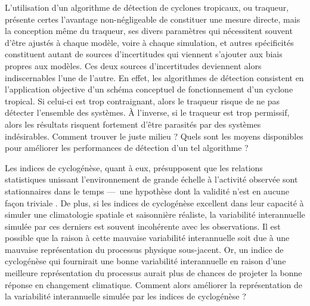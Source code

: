 \documentclass[../main.tex]{subfiles}
\begin{document}
L'utilisation d'un algorithme de détection de cyclones tropicaux, ou traqueur, présente certes l'avantage non-négligeable de constituer une mesure directe, mais
la conception même du traqueur, ses divers paramètres qui nécessitent souvent d'être ajustés à chaque modèle, voire à chaque simulation, et autres spécificités
constituent autant de sources d'incertitudes qui viennent s'ajouter aux biais propres aux modèles. Ces deux sources d'incertitudes deviennent alors
indiscernables l'une de l'autre. En effet, les algorithmes de détection consistent en l'application objective d'un schéma conceptuel de fonctionnement d'un
cyclone tropical. Si celui-ci est trop contraignant, alors le traqueur risque de ne pas détecter l'ensemble des systèmes. À l'inverse, si le traqueur est trop
permissif, alors les résultats risquent fortement d'être parasités par des systèmes indésirables. Comment trouver le juste milieu ? Quels sont les moyens
disponibles pour améliorer les performances de détection d'un tel algorithme ? 


Les indices de cyclogénèse, quant à eux, présupposent que les relations statistiques unissant l'environnement de grande échelle à l'activité observée sont
stationnaires dans le temps ---~une hypothèse dont la validité n'est en aucune façon triviale \parencite{nolan_increased_2008,murakami_changes_2013}. De plus,
si les indices de cyclogénèse excellent dans leur capacité à simuler une climatologie spatiale et saisonnière réaliste, la variabilité interannuelle simulée par
ces derniers est souvent incohérente avec les observations. Il est possible que la raison à cette mauvaise variabilité interannuelle soit due à une mauvaise
représentation du processus physique sous-jacent. Or, un indice de cyclogénèse qui fournirait une bonne variabilité interannuelle en raison d'une meilleure
représentation du processus aurait plus de chances de projeter la bonne réponse en changement climatique. Comment alors améliorer la représentation de la
variabilité interannuelle simulée par les indices de cyclogénèse ?
\end{document}
